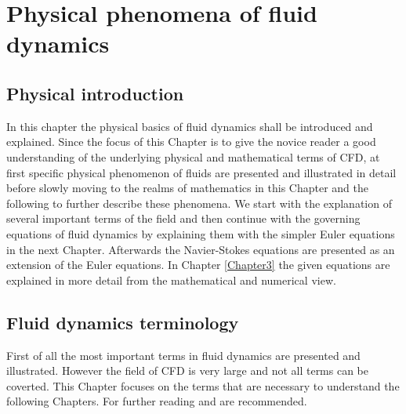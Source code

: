 
\chapter{Physical phenomena of fluid dynamics} %

\label{Chapter2} %



\section {Physical introduction}

In this chapter the physical basics of fluid dynamics shall be introduced and explained. Since the focus of this Chapter is to give the novice reader a good understanding  of the underlying physical and mathematical terms of CFD, at first specific physical phenomenon of fluids are presented and illustrated in detail before slowly moving to the realms of mathematics in this Chapter and the following to further describe these phenomena. We start with the explanation of several important terms of the field and then continue with the governing equations of fluid dynamics by explaining them with the simpler Euler equations in the next Chapter. Afterwards the Navier-Stokes equations are presented as an extension of the Euler equations. In Chapter \ref{Chapter3}  the given equations are explained in more detail from the mathematical and numerical view.



\section{Fluid dynamics terminology}
First of all the most important terms in fluid dynamics are presented and illustrated. However the field of
CFD is very large and not all terms can be coverted. This Chapter focuses on the terms that are necessary to understand the following Chapters. For further reading \citep{Hughes1999} \citep{Potter2009} and \citep{Biringen2011} are recommended.


